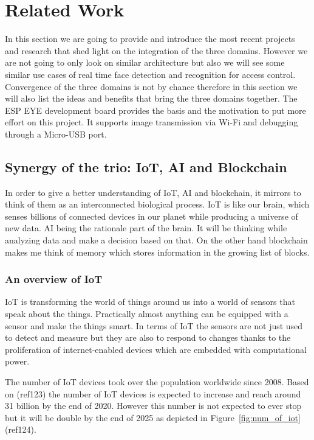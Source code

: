 \chapter{Related Work}
\label{chap:related_work}

In this section we are going to provide and introduce the most recent projects and research that shed light on the integration of the three domains. However we are not going to only look on similar architecture but also we will see some similar use cases of real time face detection and recognition for access control. Convergence of the three domains is not by chance therefore in this section we will also list the ideas and benefits that bring the three domains together. 
The ESP EYE development board  provides the basis and the motivation to put more effort on this project. It supports image transmission via Wi-Fi and debugging through a Micro-USB port. 

\section{Synergy of the trio: IoT, AI and Blockchain }

In order to give a better understanding of IoT, AI and blockchain, it mirrors to think of them as an interconnected biological process. IoT is like our brain, which senses billions of connected devices in our planet while producing a universe of new data. AI being the rationale part of the brain. It will be thinking while analyzing data and make a decision based on that. On the other hand blockchain makes me think of memory which stores information in the growing list of blocks.
\subsection{An overview of IoT}

IoT is transforming the world of things around us into a world of sensors that speak about the things. Practically almost anything can be equipped with a sensor and make the things smart. In terms of IoT the sensors are not just used to detect and measure but they are also to respond to changes thanks to the proliferation of internet-enabled devices which are embedded with computational power. 

The number of IoT devices took over the population worldwide since 2008. Based on (ref123) the number of IoT devices is expected to increase and reach around 31 billion by the end of 2020. However this number is not expected to ever stop but it will be double by the end of 2025 as depicted in Figure~\ref{fig:num_of_iot} (ref124).

